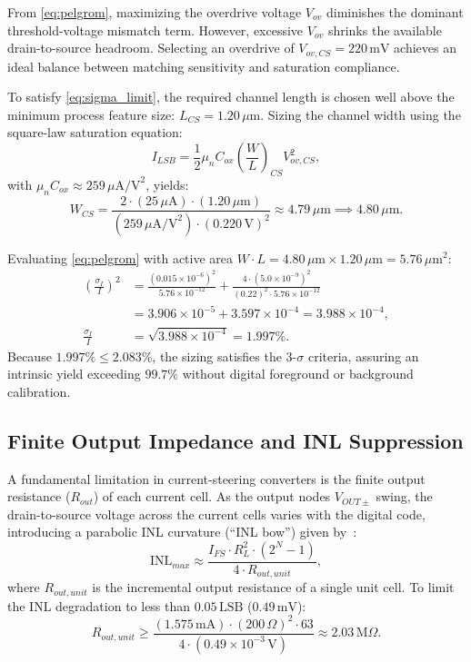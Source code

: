 \documentclass[conference,10pt]{IEEEtran}
\begin{document}
From \eqref{eq:pelgrom}, maximizing the overdrive voltage $V_{ov}$ diminishes the dominant threshold-voltage mismatch term. However, excessive $V_{ov}$ shrinks the available drain-to-source headroom. Selecting an overdrive of $V_{ov,CS} = 220\,\text{mV}$ achieves an ideal balance between matching sensitivity and saturation compliance.

To satisfy \eqref{eq:sigma_limit}, the required channel length is chosen well above the minimum process feature size: $L_{CS} = 1.20\,\mu\text{m}$. Sizing the channel width using the square-law saturation equation:
\begin{equation}
I_{LSB} = \frac{1}{2} \mu_n C_{ox} \left(\frac{W}{L}\right)_{CS} V_{ov,CS}^2,
\end{equation}
with $\mu_n C_{ox} \approx 259\,\mu\text{A/V}^2$, yields:
\begin{equation}
W_{CS} = \frac{2 \cdot (25\,\mu\text{A}) \cdot (1.20\,\mu\text{m})}{(259\,\mu\text{A/V}^2) \cdot (0.220\,\text{V})^2} \approx 4.79\,\mu\text{m} \implies 4.80\,\mu\text{m}.
\end{equation}

Evaluating \eqref{eq:pelgrom} with active area $W \cdot L = 4.80\,\mu\text{m} \times 1.20\,\mu\text{m} = 5.76\,\mu\text{m}^2$:
\begin{align}
\left( \frac{\sigma_I}{I} \right)^2 &= \frac{(0.015 \times 10^{-6})^2}{5.76 \times 10^{-12}} + \frac{4 \cdot (5.0 \times 10^{-9})^2}{(0.22)^2 \cdot 5.76 \times 10^{-12}} \nonumber \\
&= 3.906 \times 10^{-5} + 3.597 \times 10^{-4} = 3.988 \times 10^{-4}, \\
\frac{\sigma_I}{I} &= \sqrt{3.988 \times 10^{-4}} = 1.997\%.
\end{align}
Because $1.997\% \le 2.083\%$, the sizing satisfies the 3-$\sigma$ criteria, assuring an intrinsic yield exceeding $99.7\%$ without digital foreground or background calibration.

\subsection{Finite Output Impedance and INL Suppression}
A fundamental limitation in current-steering converters is the finite output resistance ($R_{out}$) of each current cell. As the output nodes $V_{OUT\pm}$ swing, the drain-to-source voltage across the current cells varies with the digital code, introducing a parabolic INL curvature (``INL bow'') given by~\cite{razavi_data_conv}:
\begin{equation}
\text{INL}_{max} \approx \frac{I_{FS} \cdot R_L^2 \cdot (2^N - 1)}{4 \cdot R_{out,unit}},
\label{eq:inl_rout}
\end{equation}
where $R_{out,unit}$ is the incremental output resistance of a single unit cell. To limit the INL degradation to less than $0.05\,\text{LSB}$ ($0.49\,\text{mV}$):
\begin{equation}
R_{out,unit} \ge \frac{(1.575\,\text{mA}) \cdot (200\,\Omega)^2 \cdot 63}{4 \cdot (0.49 \times 10^{-3}\,\text{V})} \approx 2.03\,\text{M}\Omega.
\end{equation}
\end{document}
